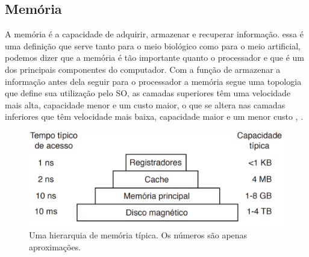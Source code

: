 \subsection{Memória}
A memória é a capacidade de adquirir, armazenar e recuperar informação. essa é uma definição que serve tanto para o meio biológico como para o meio artificial, podemos dizer que a memória  é tão importante quanto o processador e que é um dos principais componentes do computador. 
Com a função de armazenar a informação antes dela seguir para o processador a memória segue uma topologia que define sua utilização pelo SO, as camadas superiores têm uma velocidade mais alta, capacidade menor e um custo maior, o que se altera nas camadas inferiores que têm velocidade mais baixa, capacidade maior e um menor custo \cite{Tanenbaum2016}, \cite{Comer2012}.\\
\begin{figure}[htpb]
    \centering
   \includegraphics[scale=0.5]{imagens/lvlmemoria.png}
   \caption{Uma hierarquia de memória típica. Os números são apenas aproximações. \cite{Tanenbaum2016}}
   \label{fig:lvlmemoria}
\end{figure}\\

